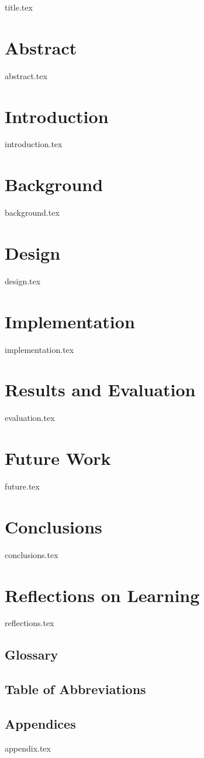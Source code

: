 \documentclass[12pt,a4paper,oneside,openright]{book}
\begin{document}
	\begin{titlepage}
		{title.tex}
	\end{titlepage}
	\restoregeometry

	\frontmatter

	\chapter*{Abstract}
		{abstract.tex}

	\tableofcontents
	\listoffigures
	\listoftables

	\mainmatter

	\chapter{Introduction}
		{introduction.tex}

	\chapter{Background}
		{background.tex}

	\chapter{Design} \label{chap:design}
		{design.tex}

	\chapter{Implementation}
		{implementation.tex}

	\chapter{Results and Evaluation}
		{evaluation.tex}

	\chapter{Future Work}
		{future.tex}

	\chapter{Conclusions}
		{conclusions.tex}

	\chapter{Reflections on Learning}
		{reflections.tex}

	\backmatter
	\section*{Glossary}
	\section*{Table of Abbreviations}
	\section*{Appendices}
		{appendix.tex}

	\printbibliography
\end{document}
